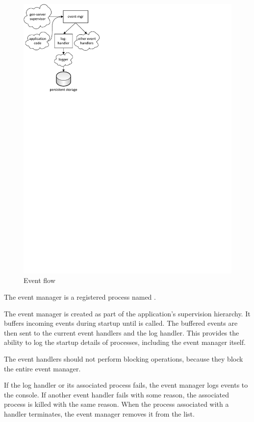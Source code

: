 \begin{figure}
  \begin{center}
    \includegraphics[trim=0 531 387 0]{swish/event-mgr-events.pdf}
  \end{center}
  \caption{\label{fig:event-mgr-flow}Event flow}
\end{figure}

The event manager is a registered process named .

The event manager is created as part of the application's supervision
hierarchy. It buffers incoming events during startup until
 is called. The buffered events are
then sent to the current event handlers and the log handler. This
provides the ability to log the startup details of processes,
including the event manager itself.

The event handlers should not perform blocking operations, because
they block the entire event manager.

If the log handler or its associated process fails, the event manager
logs events to the console. If another event handler fails with some
reason, the associated process is killed with the same reason. When
the process associated with a handler terminates, the event manager
removes it from the list.

